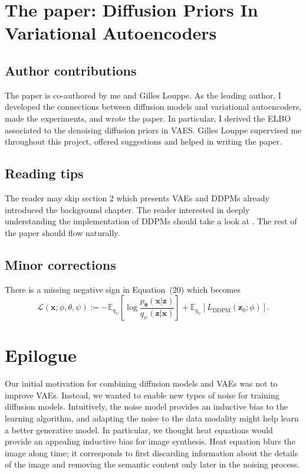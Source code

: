 \section{The paper: Diffusion Priors In Variational Autoencoders}

\subsection{Author contributions}
The paper is co-authored by me and Gilles Louppe. As the leading author, I developed the connections between diffusion models and variational autoencoders, made the experiments, and wrote the paper. In particular, I derived the ELBO associated to the denoising diffusion priors in VAES. Gilles Louppe supervised me throughout this project, offered suggestions and helped in writing the paper.

\subsection{Reading tips}
The reader may skip section 2 which presents VAEs and DDPMs already introduced the background chapter. The reader interested in deeply understanding the implementation of DDPMs should take a look at \citet{ho_denoising_2020}. The rest of the paper should flow naturally.

\subsection{Minor corrections}
There is a missing negative sign in Equation~(20) which becomes
$$\mathcal{L}(\mathbf{x}; \phi, \theta, \psi) := -\mathbb{E}_{q_{\psi}}\left[\log \frac{p_{\mathbf{\theta}}(\mathbf{x}|\mathbf{z})}{q_{\psi}(\mathbf{z}|\mathbf{x})} \right] + \mathbb{E}_{q_{\psi}}\left[ L_{\text{DDPM}}(\mathbf{z}_0; \phi)\right].$$



\section{Epilogue}

Our initial motivation for combining diffusion models and VAEs was not to improve VAEs. Instead, we wanted to enable new types of noise for training diffusion models. Intuitively, the noise model provides an inductive bias to the learning algorithm, and adapting the noise to the data modality might help learn a better generative model. In particular, we thought heat equations would provide an appealing inductive bias for image synthesis. Heat equation blurs the image along time; it corresponds to first discarding information about the details of the image and removing the semantic content only later in the noising process.

